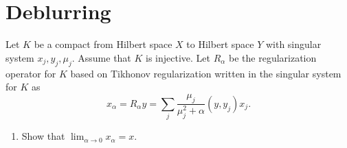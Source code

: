 \section{Deblurring}%
\label{sec:deblurring}

Let $K$ be a compact from Hilbert space $X$ to Hilbert space $Y$ with singular system ${x_j, y_j, \mu_j}$. Assume that $K$ is injective. Let $R_\alpha$ be the regularization operator for $K$ based on Tikhonov regularization written in the singular system for $K$ as
\[
x_\alpha = R_\alpha y = \sum_j \frac{\mu_j}{\mu_j^2 + \alpha} (y, y_j)x_j.
\] 

\begin{enumerate}[label = (\alph*)]
  \item Show that $\lim_{\alpha \to 0} x_\alpha = x$.
\end{enumerate}

\nopagebreak
\noindent\hrulefill

